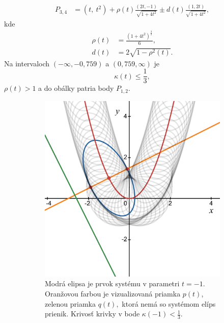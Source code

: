 \begin{example}[Parabola]
\begin{align*}
P_{3,4} &= \left(t,\ t^{2}\right)+ \rho(t)\frac{\left(2t,-1\right)}{\sqrt{1+4t^{2}}} \pm d(t) \frac{\left(1,2t\right)}{\sqrt{1+4t^{2}}},
\end{align*}
kde 
\begin{align*}
\rho(t) &= \frac{\left(1+4t^{2}\right)^{\frac{3}{2}}}{6}, \\
d(t) &= 2 \sqrt{1 -\rho^{2}(t)}.
\end{align*}
Na intervaloch $(-\infty, -0,759) $ a $(0,759, \infty)$ je 
$$
\kappa(t) \leq \frac{1}{3},
$$
$\rho(t) > 1$ a do obálky patria body $P_{1,2}.$ 
\end{example}

\begin{figure}[h]
    \centering
    \begin{subfigure}[b]{0.49\textwidth}
        \centering
        \includegraphics[width=\textwidth]{images/axis_t=-1.pdf}
	\caption{Modrá elipsa je prvok systému v parametri $t=-1.$ Oranžovou farbou je vizualizovaná priamka $p(t)$, zelenou priamka $q(t),$ ktorá nemá so systémom elíps prienik. Krivosť krivky v bode $\kappa(-1) < \frac{1}{3}.$}
        \label{fig:parabola_1}
    \end{subfigure}
    \hfill
    \begin{subfigure}[b]{0.49\textwidth}
        \centering

\end{subfigure}
\end{figure}
